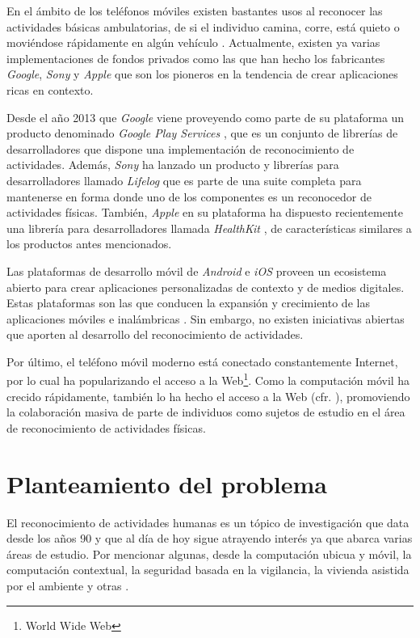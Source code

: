 En el ámbito de los teléfonos móviles existen bastantes usos al reconocer
las actividades básicas ambulatorias, de si el individuo camina, corre,
está quieto o moviéndose rápidamente en algún vehículo \cite{CampuzanoLopez2015,Google2013l}.
Actualmente, existen ya varias implementaciones de fondos privados
como las que han hecho los fabricantes \emph{Google}, \emph{Sony}
y \emph{Apple} que son los pioneros en la tendencia de crear aplicaciones
ricas en contexto.

Desde el año 2013 que \emph{Google} viene proveyendo como parte de
su plataforma \emph{ }\cite{Google2005a} un producto
denominado \emph{Google Play Services} \cite{Google2016l}, que es
un conjunto de librerías de desarrolladores que dispone una implementación
de reconocimiento de actividades. Además, \emph{Sony} ha lanzado un
producto y librerías para desarrolladores llamado \emph{Lifelog} \cite{Sony2016l}
que es parte de una suite completa para mantenerse en forma donde
uno de los componentes es un reconocedor de actividades físicas. También,
\emph{Apple} en su plataforma  \cite{Apple2007i} ha dispuesto
recientemente una librería para desarrolladores llamada \emph{HealthKit}
\cite{Apple2016h}, de características similares a los productos antes
mencionados. 

Las plataformas de desarrollo móvil de \emph{Android} e \emph{iOS
}proveen un ecosistema abierto para crear aplicaciones personalizadas
de contexto y de medios digitales. Estas plataformas son las que conducen
la expansión y crecimiento de las aplicaciones móviles e inalámbricas
\cite{Tanenbaum2010}. Sin embargo, no existen iniciativas abiertas
que aporten al desarrollo del reconocimiento de actividades.

Por último, el teléfono móvil moderno está conectado constantemente
Internet, por lo cual ha popularizando el acceso a la Web\footnote{World Wide Web}.
Como la computación móvil ha crecido rápidamente, también lo ha hecho
el acceso a la Web (cfr. \cite{NYTimes2008iph}), promoviendo la colaboración
masiva de parte de individuos como sujetos de estudio en el área de
reconocimiento de actividades físicas.

\section{Planteamiento del problema}

\label{planteamiento}

El reconocimiento de actividades humanas es un tópico de investigación
que data desde los años 90 y que al día de hoy sigue atrayendo interés
ya que abarca varias áreas de estudio. Por mencionar algunas, desde
la computación ubicua y móvil, la computación contextual, la seguridad
basada en la vigilancia, la vivienda asistida por el ambiente y otras
\cite{chen2012sensor}. 

